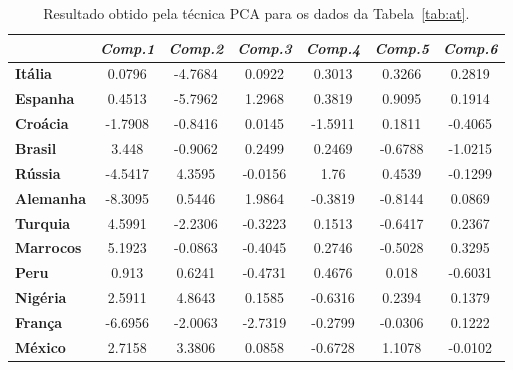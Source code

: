 \begin{table}[!h]
    \caption[Resultado de PCA]
    {Resultado obtido pela técnica PCA para os dados da
    Tabela~\ref{tab:at}.}
    \begin{center}
        \begin{tabular}{|l|c|c|c|c|c|c|}
            \hline
            & \multicolumn{1}{l|}{\textbf{\textit{Comp.1}}}
            & \multicolumn{1}{l|}{\textbf{\textit{Comp.2}}}
            & \multicolumn{1}{l|}{\textbf{\textit{Comp.3}}}
            & \multicolumn{1}{l|}{\textbf{\textit{Comp.4}}}
            & \multicolumn{1}{l|}{\textbf{\textit{Comp.5}}}
            & \multicolumn{1}{l|}{\textbf{\textit{Comp.6}}}
            \\ \hline
    \textbf{Itália} & 0.0796 & -4.7684 & 0.0922 & 0.3013 & 0.3266 & 0.2819 \\ \hline
    \textbf{Espanha} & 0.4513 & -5.7962 & 1.2968 & 0.3819 & 0.9095 & 0.1914 \\ \hline
    \textbf{Croácia} & -1.7908 & -0.8416 & 0.0145 & -1.5911 & 0.1811 & -0.4065 \\ \hline
    \textbf{Brasil} & 3.448 & -0.9062 & 0.2499 & 0.2469 & -0.6788 & -1.0215 \\ \hline
    \textbf{Rússia} & -4.5417 & 4.3595 & -0.0156 & 1.76 & 0.4539 & -0.1299 \\ \hline
    \textbf{Alemanha} & -8.3095 & 0.5446 & 1.9864 & -0.3819 & -0.8144 & 0.0869 \\ \hline
    \textbf{Turquia} & 4.5991 & -2.2306 & -0.3223 & 0.1513 & -0.6417 & 0.2367 \\ \hline
    \textbf{Marrocos} & 5.1923 & -0.0863 & -0.4045 & 0.2746 & -0.5028 & 0.3295 \\ \hline
    \textbf{Peru} & 0.913 & 0.6241 & -0.4731 & 0.4676 & 0.018 & -0.6031 \\ \hline
    \textbf{Nigéria} & 2.5911 & 4.8643 & 0.1585 & -0.6316 & 0.2394 & 0.1379 \\ \hline
    \textbf{França} & -6.6956 & -2.0063 & -2.7319 & -0.2799 & -0.0306 & 0.1222 \\ \hline
    \textbf{México} & 2.7158 & 3.3806 & 0.0858 & -0.6728 & 1.1078 & -0.0102 \\ \hline
        \end{tabular}
    \end{center}
    \label{tab:at-pcs}
\end{table}

